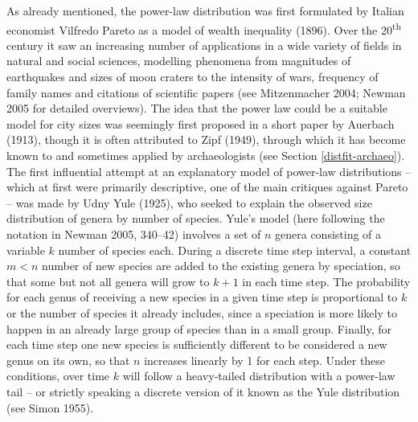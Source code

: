 \documentclass[
  12pt,
  a4paper, twoside]{book}
\begin{document}
As already mentioned, the power-law distribution was first formulated by Italian economist Vilfredo Pareto as a model of wealth inequality (1896). Over the 20\textsuperscript{th} century it saw an increasing number of applications in a wide variety of fields in natural and social sciences, modelling phenomena from magnitudes of earthquakes and sizes of moon craters to the intensity of wars, frequency of family names and citations of scientific papers (see Mitzenmacher 2004; Newman 2005 for detailed overviews). The idea that the power law could be a suitable model for city sizes was seemingly first proposed in a short paper by Auerbach (1913), though it is often attributed to Zipf (1949), through which it has become known to and sometimes applied by archaeologists (see Section \ref{distfit-archaeo}). The first influential attempt at an explanatory model of power-law distributions -- which at first were primarily descriptive, one of the main critiques against Pareto -- was made by Udny Yule (1925), who seeked to explain the observed size distribution of genera by number of species. Yule's model (here following the notation in Newman 2005, 340--42) involves a set of \(n\) genera consisting of a variable \(k\) number of species each. During a discrete time step interval, a constant \(m < n\) number of new species are added to the existing genera by speciation, so that some but not all genera will grow to \(k+1\) in each time step. The probability for each genus of receiving a new species in a given time step is proportional to \(k\) or the number of species it already includes, since a speciation is more likely to happen in an already large group of species than in a small group. Finally, for each time step one new species is sufficiently different to be considered a new genus on its own, so that \(n\) increases linearly by 1 for each step. Under these conditions, over time \(k\) will follow a heavy-tailed distribution with a power-law tail -- or strictly speaking a discrete version of it known as the Yule distribution (see Simon 1955).
\end{document}
